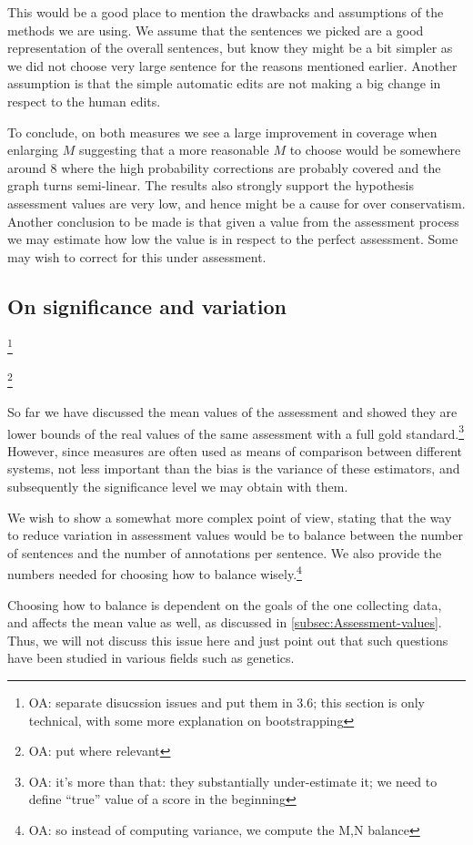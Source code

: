 \documentclass[letter,11pt]{article}
\newcommand{\oa}[1]{\footnote{\color{red}OA: #1}}
\begin{document}
This would be a good place to mention the drawbacks and assumptions of the methods we are using. We assume that the sentences we picked are a good representation of the overall sentences, but know they might be a bit simpler as we did not choose very large sentence for the reasons mentioned earlier. Another assumption is that the simple automatic edits are not making a big change in respect to the human edits.

To conclude, on both measures we see a large improvement in coverage when enlarging $M$ suggesting that a more reasonable $M$ to choose would be somewhere around 8 where the high probability corrections are probably covered and the graph turns semi-linear. The results also strongly support the hypothesis assessment values are very low, and hence might be a cause for over conservatism.
 Another conclusion to be made is that given a value from the assessment process we may estimate how low the value is in respect to the perfect assessment. Some may wish to correct for this under assessment.



 
\subsection{On significance and variation}

\oa{separate disucssion issues and put them in 3.6; this section is only
  technical, with some more explanation on bootstrapping}

\cite{yeh2000more}\oa{put where relevant}


So far we have discussed the mean values of the assessment and showed they are lower bounds of the real values of the same assessment with a full gold standard.\oa{it's more than that: they substantially under-estimate it; we need to define ``true'' value of a score in the beginning} However, since measures are often used as means of comparison between different systems, not less important than the bias is the variance of these estimators, and subsequently the significance level we may obtain with them.

We wish to show a somewhat more complex point of view, stating that the way to reduce variation in assessment values would be to balance between the number of sentences and the number of annotations per sentence. We also provide the numbers needed for choosing how to balance wisely.\oa{so instead of computing variance, we compute the M,N balance} 

Choosing how to balance is dependent on the goals of the one collecting data, and affects the mean value as well, as discussed in \ref{subsec:Assessment-values}. Thus, we will not discuss this issue here and just point out that such questions have been studied in various fields such as genetics\cite{ionita2010optimal}.
\end{document}

